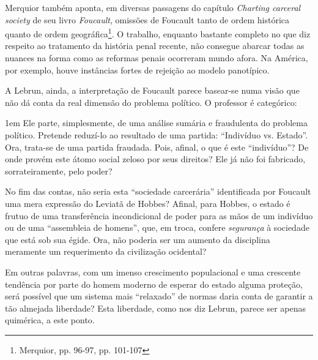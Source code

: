 \documentclass[12pt,a4paper]{article}
\newenvironment{citac}
{
	\begin{addmargin}
		[4cm]{1em} \footnotesize}{\normalfont 
	\end{addmargin}
}
\begin{document}
	Merquior também aponta, em diversas passagens do capítulo 
	\textit{Charting carceral society} de seu livro \textit{Foucault}, 
	omissões de Foucault tanto de ordem histórica quanto de ordem 
	geográfica\footnote{Merquior, pp. 96-97, pp. 101-107}. O trabalho, 
	enquanto bastante completo no que diz respeito ao tratamento da 
	história penal recente, não consegue abarcar todas as nuances na 
	forma como as reformas penais ocorreram mundo afora. Na América, 
	por exemplo, houve instâncias fortes de rejeição ao modelo 
	panotípico. 

	A Lebrun, ainda, a interpretação de Foucault parece basear-se 
	numa visão que não dá conta da real dimensão do problema político. 
	O professor é categórico: 

	\begin{citac}
		Ele parte, simplesmente, de uma análise sumária e fraudulenta 
		do problema político. Pretende reduzí-lo ao resultado de uma 
		partida: “Indivíduo vs. Estado”. Ora, trata-se de uma partida 
		fraudada. Pois, afinal, o que é este “indivíduo”? De onde 
		provém este átomo social zeloso por seus direitos? Ele já não 
		foi fabricado, sorrateiramente, pelo poder? 
	\end{citac}

	No fim das contas, não seria esta ``sociedade carcerária'' 
	identificada por Foucault uma mera expressão do Leviatã 
	de Hobbes? Afinal, para Hobbes, o estado é frutuo de uma 
	transferência incondicional de poder para as mãos de um 
	indivíduo ou de uma ``assembleia de homens'', que, em troca, 
	confere \textit{segurança} à sociedade que está sob sua égide. 
	Ora, não poderia ser um aumento da disciplina meramente um 
	requerimento da civilização ocidental? 

	Em outras palavras, com um imenso crescimento populacional e 
	uma crescente tendência por parte do homem moderno de esperar 
	do estado alguma proteção, será possível que um sistema mais 
	``relaxado'' de normas daria conta de garantir a tão almejada 
	liberdade? Esta liberdade, como nos diz Lebrun, parece ser 
	apenas quimérica, a este ponto. 




\end{document}
